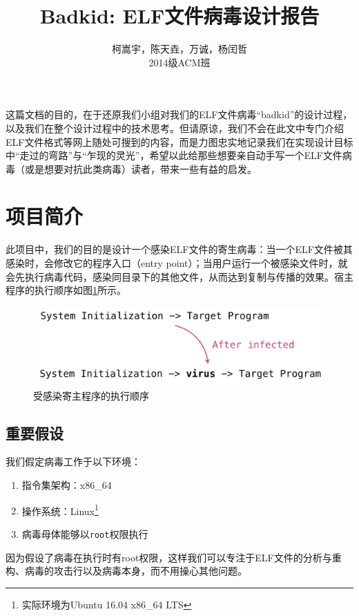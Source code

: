 \documentclass[a4paper, 11pt]{article}
\begin{document}
\title{Badkid: ELF文件病毒设计报告}

\author{柯嵩宇，陈天垚，万诚，杨闰哲\vspace{1em} \\ 2014级ACM班}
\maketitle

这篇文档的目的，在于还原我们小组对我们的ELF文件病毒“badkid”的设计过程，以及我们在整个设计过程中的技术思考。但请原谅，我们不会在此文中专门介绍ELF文件格式等网上随处可搜到的内容，而是力图忠实地记录我们在实现设计目标中“走过的弯路”与“乍现的灵光”，希望以此给那些想要亲自动手写一个ELF文件病毒（或是想要对抗此类病毒）读者，带来一些有益的启发。

\tableofcontents
\newpage
\section{项目简介}
	此项目中，我们的目的是设计一个感染ELF文件的寄生病毒：当一个ELF文件被其感染时，会修改它的程序入口（entry point）；当用户运行一个被感染文件时，就会先执行病毒代码，感染同目录下的其他文件，从而达到复制与传播的效果。宿主程序的执行顺序如图\ref{fig:order}所示。
	\vspace{1em}
	\begin{figure}[htbp]
		\centering
		\includegraphics[width = \textwidth]{figures/fig3_first}
		\caption{受感染寄主程序的执行顺序}
		\label{fig:order}
	\end{figure}
\subsection{重要假设}	
	我们假定病毒工作于以下环境：
	\begin{enumerate}
		\item 指令集架构：x86\_64
		\item 操作系统：Linux\footnote{实际环境为Ubuntu 16.04 x86\_64 LTS}
		\item 病毒母体能够以\texttt{root}权限执行
	\end{enumerate}
	
	因为假设了病毒在执行时有root权限，这样我们可以专注于ELF文件的分析与重构、病毒的攻击行以及病毒本身，而不用操心其他问题。
\end{document}
